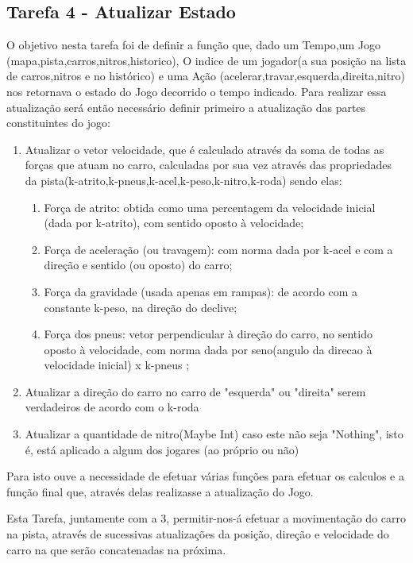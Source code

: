 \documentclass[a4paper]{report} %
\begin{document}
\subsection{Tarefa 4 - Atualizar Estado}
O objetivo nesta tarefa foi de definir a função que, dado um Tempo,um Jogo (mapa,pista,carros,nitros,historico), O indice de um jogador(a sua posição na lista de carros,nitros e no histórico) e uma Ação (acelerar,travar,esquerda,direita,nitro) nos retornava o estado do Jogo decorrido o tempo indicado.
Para realizar essa atualização será então necessário definir primeiro a atualização das partes constituintes do jogo:

\begin{enumerate}
\item Atualizar o vetor velocidade, que é calculado através da soma de todas as forças que atuam no carro, calculadas por sua vez através das propriedades da pista(k-atrito,k-pneus,k-acel,k-peso,k-nitro,k-roda) sendo elas:

\begin{enumerate}
\item Força de atrito: obtida como uma percentagem da velocidade inicial (dada por
k-atrito), com sentido oposto à velocidade;
\item Força de aceleração (ou travagem): com norma dada por k-acel e com a
direção e sentido (ou oposto) do carro;
\item Força da gravidade (usada apenas em rampas): de acordo com a constante
k-peso, na direção do declive;
\item Força dos pneus: vetor perpendicular à direção do carro, no sentido oposto à
velocidade, com norma dada por seno(angulo da direcao à velocidade inicial) x k-pneus ; 
\end{enumerate}

\item Atualizar a direção do carro no carro de "esquerda" ou "direita" serem verdadeiros de acordo com o k-roda
\item Atualizar a quantidade de nitro(Maybe Int) caso este não seja "Nothing", isto é, está aplicado a algum dos jogares (ao próprio ou não)
\end{enumerate}

Para isto ouve a necessidade de efetuar várias funções para efetuar os calculos e a função final que, através delas realizasse a atualização do Jogo.

Esta Tarefa, juntamente com a 3, permitir-nos-á efetuar a movimentação do carro na pista, através de sucessivas atualizações da posição, direção e velocidade do carro na que serão concatenadas na próxima.
\end{document}
